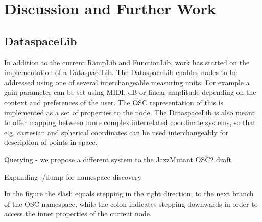 \documentclass{NIME-alternate}
\begin{document}








\section{Discussion and Further Work} %
\label{sec:discussion_and_further_work}   


\subsection{DataspaceLib} %
\label{sub:dataspacelib}

In addition to the current RampLib and FunctionLib, work has started on the implementation of a DataspaceLib.  The DataspaceLib enables nodes to be addressed using one of several interchangeable measuring units. For example a gain parameter can be set using MIDI, dB or linear amplitude depending on the context and preferences of the user. The OSC representation of this is implemented as a set of properties to the node. The DataspaceLib is also meant to offer mapping between more complex interrelated coordinate systems, so that e.g. cartesian and spherical coordinates can be used interchangeably for description of points in space.




Querying - we propose a different system to the JazzMutant OSC2 draft

Expanding :/dump for namespace discovery

In the figure the slash equals stepping in the right direction, to the next branch of the OSC namespace, while the colon indicates stepping downwards in order to access the inner properties of the current node.
\end{document}
